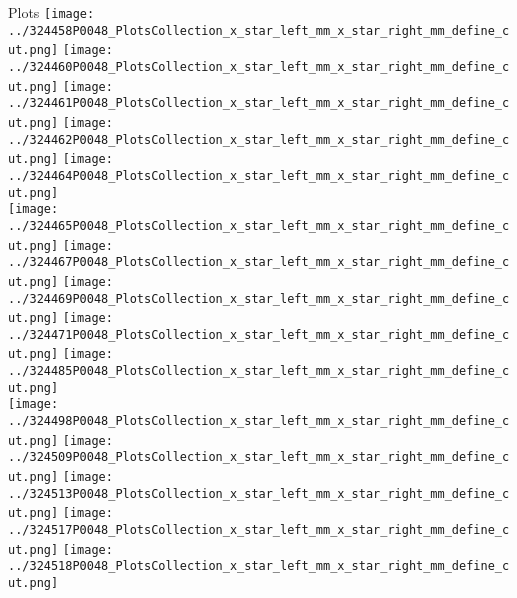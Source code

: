 \documentclass{beamer}
\begin{document}
\begin{frame}\tiny
        \begin{block}{Plots}
		  \centering
                \texttt{[image: ../324458P0048\_PlotsCollection\_x\_star\_left\_mm\_x\_star\_right\_mm\_define\_cut.png]}
                \texttt{[image: ../324460P0048\_PlotsCollection\_x\_star\_left\_mm\_x\_star\_right\_mm\_define\_cut.png]}
                \texttt{[image: ../324461P0048\_PlotsCollection\_x\_star\_left\_mm\_x\_star\_right\_mm\_define\_cut.png]}
                \texttt{[image: ../324462P0048\_PlotsCollection\_x\_star\_left\_mm\_x\_star\_right\_mm\_define\_cut.png]}
                \texttt{[image: ../324464P0048\_PlotsCollection\_x\_star\_left\_mm\_x\_star\_right\_mm\_define\_cut.png]}\\
                \texttt{[image: ../324465P0048\_PlotsCollection\_x\_star\_left\_mm\_x\_star\_right\_mm\_define\_cut.png]}
                \texttt{[image: ../324467P0048\_PlotsCollection\_x\_star\_left\_mm\_x\_star\_right\_mm\_define\_cut.png]}
                \texttt{[image: ../324469P0048\_PlotsCollection\_x\_star\_left\_mm\_x\_star\_right\_mm\_define\_cut.png]}
                \texttt{[image: ../324471P0048\_PlotsCollection\_x\_star\_left\_mm\_x\_star\_right\_mm\_define\_cut.png]}
                \texttt{[image: ../324485P0048\_PlotsCollection\_x\_star\_left\_mm\_x\_star\_right\_mm\_define\_cut.png]}\\
                \texttt{[image: ../324498P0048\_PlotsCollection\_x\_star\_left\_mm\_x\_star\_right\_mm\_define\_cut.png]}
                \texttt{[image: ../324509P0048\_PlotsCollection\_x\_star\_left\_mm\_x\_star\_right\_mm\_define\_cut.png]}
                \texttt{[image: ../324513P0048\_PlotsCollection\_x\_star\_left\_mm\_x\_star\_right\_mm\_define\_cut.png]}
                \texttt{[image: ../324517P0048\_PlotsCollection\_x\_star\_left\_mm\_x\_star\_right\_mm\_define\_cut.png]}
                \texttt{[image: ../324518P0048\_PlotsCollection\_x\_star\_left\_mm\_x\_star\_right\_mm\_define\_cut.png]}\\

\end{block}
\end{frame}
\end{document}
